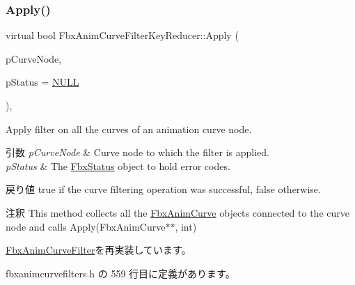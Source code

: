 \subsubsection{\texorpdfstring{Apply()}{Apply()}\hspace{0.1cm}{\footnotesize\ttfamily [3/5]}}
{\footnotesize\ttfamily virtual bool Fbx\+Anim\+Curve\+Filter\+Key\+Reducer\+::\+Apply (\begin{DoxyParamCaption}\item[{\hyperlink{class_fbx_anim_curve_node}{Fbx\+Anim\+Curve\+Node} \&}]{p\+Curve\+Node,  }\item[{\hyperlink{class_fbx_status}{Fbx\+Status} $\ast$}]{p\+Status = {\ttfamily \hyperlink{fbxarch_8h_a070d2ce7b6bb7e5c05602aa8c308d0c4}{N\+U\+LL}} }\end{DoxyParamCaption})\hspace{0.3cm}{\ttfamily [inline]}, {\ttfamily [virtual]}}

Apply filter on all the curves of an animation curve node. 
\begin{DoxyParams}{引数}
{\em p\+Curve\+Node} & Curve node to which the filter is applied. \\
\hline
{\em p\+Status} & The \hyperlink{class_fbx_status}{Fbx\+Status} object to hold error codes. \\
\hline
\end{DoxyParams}
\begin{DoxyReturn}{戻り値}
{\ttfamily true} if the curve filtering operation was successful, {\ttfamily false} otherwise. 
\end{DoxyReturn}
\begin{DoxyRemark}{注釈}
This method collects all the \hyperlink{class_fbx_anim_curve}{Fbx\+Anim\+Curve} objects connected to the curve node and calls Apply(\+Fbx\+Anim\+Curve$\ast$$\ast$, int) 
\end{DoxyRemark}


\hyperlink{class_fbx_anim_curve_filter_ad042b45c0675278fa49e61739b0825c2}{Fbx\+Anim\+Curve\+Filter}を再実装しています。



 fbxanimcurvefilters.\+h の 559 行目に定義があります。

\mbox{\label{class_fbx_anim_curve_filter_key_reducer_a8c0c58b8f2e4272bc5f257570daf5ba1}} 
